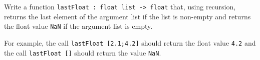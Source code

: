 Write a function
%
\lstinline{lastFloat : float list -> float}
%
that, using recursion, returns the last element of the argument list
if the list is non-empty and returns the float value \lstinline{NaN}
if the argument list is empty.

For example, the call
%
\lstinline{lastFloat [2.1;4.2]}
%
should return the float value \lstinline{4.2} and the call
%
\lstinline{lastFloat []}
%
should return the value \lstinline{NaN}.
